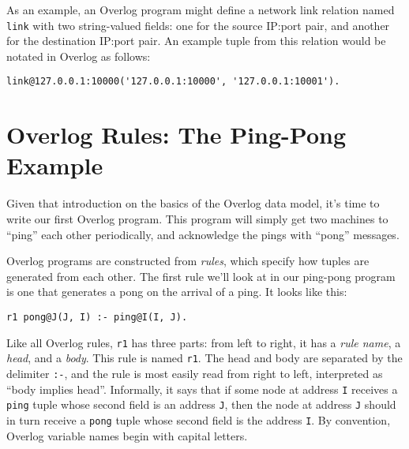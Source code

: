 \documentclass{article}
\begin{document}
As an example, an Overlog program might define a network link relation
named \lstinline$link$ with two string-valued fields: one for the
source IP:port pair, and another for the destination IP:port pair.  An
example tuple from this relation would be notated in Overlog as
follows:
\begin{lstlisting}
link@127.0.0.1:10000('127.0.0.1:10000', '127.0.0.1:10001').
\end{lstlisting}

\section{Overlog Rules: The Ping-Pong Example}
Given that introduction on the basics of the Overlog data model, it's
time to write our first Overlog program.  This program will simply get
two machines to ``ping'' each other periodically, and acknowledge the
pings with ``pong'' messages.

Overlog programs are constructed from {\em rules}, which specify how
tuples are generated from each other.  The first rule we'll look at in
our ping-pong program is one that generates a pong on the arrival of a
ping.  It looks like this:
\begin{lstlisting}
r1 pong@J(J, I) :- ping@I(I, J).
\end{lstlisting}
Like all Overlog rules, \lstinline$r1$ has three parts: from left to
right, it has a {\em rule name}, a {\em head}, and a {\em body}. This
rule is named \lstinline$r1$.  The head and body are separated by the
delimiter \lstinline$:-$, and the rule is most easily read from right
to left, interpreted as ``body implies head''.  Informally, it says
that if some node at address \lstinline$I$ receives a \lstinline$ping$
tuple whose second field is an address \lstinline$J$, then the node at
address \lstinline$J$ should in turn receive a \lstinline$pong$ tuple
whose second field is the address \lstinline$I$.  By convention,
Overlog variable names begin with capital letters.
\end{document}
